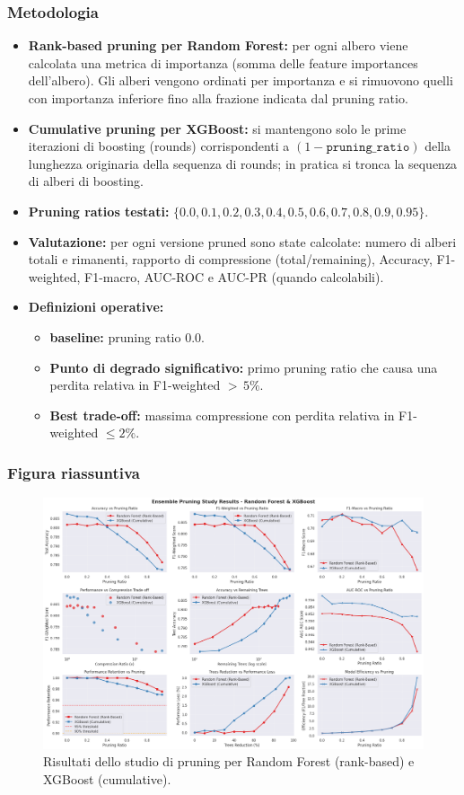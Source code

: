 \documentclass[a4paper,12pt]{report}
\begin{document}
	\subsubsection{Metodologia}
	\begin{itemize}
		\item \textbf{Rank-based pruning per Random Forest:} per ogni albero viene calcolata una metrica di importanza (somma delle feature importances dell'albero). Gli alberi vengono ordinati per importanza e si rimuovono quelli con importanza inferiore fino alla frazione indicata dal pruning ratio.
		\item \textbf{Cumulative pruning per XGBoost:} si mantengono solo le prime iterazioni di boosting (rounds) corrispondenti a \((1 - \texttt{pruning\_ratio})\) della lunghezza originaria della sequenza di rounds; in pratica si tronca la sequenza di alberi di boosting.
		\item \textbf{Pruning ratios testati:} \(\{0.0,0.1,0.2,0.3,0.4,0.5,0.6,0.7,0.8,0.9,0.95\}\).
		\item \textbf{Valutazione:} per ogni versione pruned sono state calcolate: numero di alberi totali e rimanenti, rapporto di compressione (total/remaining), Accuracy, F1-weighted, F1-macro, AUC-ROC e AUC-PR (quando calcolabili).
		\item \textbf{Definizioni operative:}
		\begin{itemize}
			\item \textbf{baseline:} pruning ratio 0.0.
			\item \textbf{Punto di degrado significativo:} primo pruning ratio che causa una perdita relativa in F1-weighted \(>\,5\%\).
			\item \textbf{Best trade-off:} massima compressione con perdita relativa in F1-weighted \(\leq 2\%\).
		\end{itemize}
	\end{itemize}
	
	\subsubsection{Figura riassuntiva}
	\begin{figure}[H]
		\centering
		\includegraphics[width=\textwidth]{img/abl_xgbvsrf_pm.png}
		\caption{Risultati dello studio di pruning per Random Forest (rank-based) e XGBoost (cumulative).}
	\end{figure}
	
\end{document}
